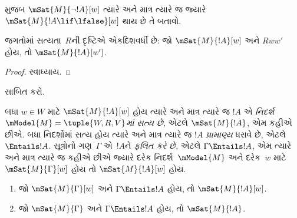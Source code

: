 \begin{prob}
   મુજબ
  $\mSat{M}{\lnot !A}[w]$ ત્યારે અને માત્ર ત્યારે જ જ્યારે
  $\mSat{M}{!A \lif \lfalse}[w]$ થાય છે તે બતાવો.
\end{prob}

\begin{prop}
  જગતોમાં સત્યતા~$R$ની દૃષ્ટિએ એકદિશવર્ધી છે: જો
  $\mSat{M}{!A}[w]$ અને $Rww'$ હોય, તો
  $\mSat{M}{!A}[w']$.
\end{prop}

\begin{proof}
  સ્વાધ્યાય.
\end{proof}

\begin{prob}
   સાબિત કરો.
\end{prob}
\endgroup

\begingroup
\makeatletter{}\makeatother


\label{guunit:OLP-0501}


\begin{defn}
  બધા $w \in W$ માટે $\mSat{M}{!A}[w]$ હોય ત્યારે અને માત્ર
  ત્યારે જ $!A$ એ \emph{નિદર્શ $\mModel{M} = \tuple{W,R,V}$માં
  સત્ય છે}, એટલે $\mSat{M}{!A}$, એમ કહીએ છીએ.
  બધા નિદર્શોમાં સત્ય હોય ત્યારે અને માત્ર ત્યારે જ $!A$
  \emph{પ્રામાણ્ય} ધરાવે છે, એટલે $\Entails !A$.
  સૂત્રોનો ગણ~$\Gamma$ એ~$!A$ને \emph{ફલિત કરે છે},
  એટલે $\Gamma \Entails !A$, એમ ત્યારે અને માત્ર ત્યારે જ
  કહીએ છીએ જ્યારે દરેક નિદર્શ~$\mModel{M}$ અને દરેક~$w$
  માટે $\mSat{M}{\Gamma}[w]$ હોય તો $\mSat{M}{!A}[w]$ હોય.
\end{defn}

\begin{prop}
  \begin{enumerate}
  \item{} જો $\mSat{M}{\Gamma}[w]$ અને
    $\Gamma \Entails !A$ હોય, તો $\mSat{M}{!A}[w]$.
  \item{} જો $\mSat{M}{\Gamma}$ અને $\Gamma
    \Entails !A$ હોય, તો $\mSat{M}{!A}$.
  \end{enumerate}
\end{prop}

